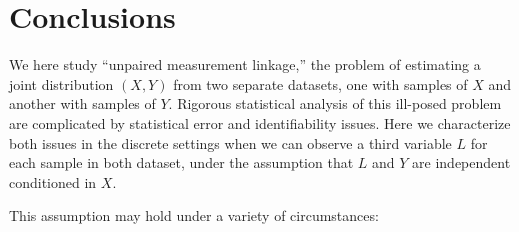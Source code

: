 \documentclass{article}
\theoremstyle{definition}
\begin{document}
                                                    

\section{Conclusions}

\label{sec:conclusions}

We here study ``unpaired measurement linkage,'' the problem of estimating a joint distribution $(X,Y)$ from two separate datasets, one with samples of $X$ and another with samples of $Y$.  Rigorous statistical analysis of this ill-posed problem are complicated by statistical error and identifiability issues.  Here we characterize both issues in the discrete settings when we can observe a third variable $L$ for each sample in both dataset, under the assumption that $L$ and $Y$ are independent conditioned in $X$.  

This assumption may hold under a variety of circumstances:
\end{document}
